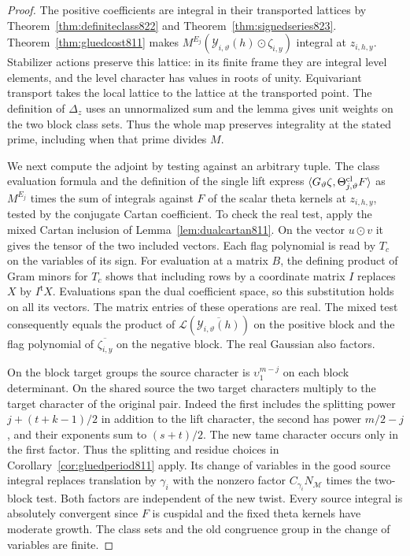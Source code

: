\documentclass[a4paper,11pt]{article}
\theoremstyle{definition}
\theoremstyle{remark}
\numberwithin{equation}{section}
\begin{document}
\begin{proof}
The positive coefficients are integral in their transported lattices
by Theorem~\ref{thm:definiteclass822} and
Theorem~\ref{thm:signedseries823}. Theorem~\ref{thm:gluedcost811}
makes \(M^{E_j}(\mathcal Y_{i,\vartheta}(h)\odot\zeta_{i,y})\)
integral at \(z_{i,h,y}\). Stabilizer actions preserve this lattice:
in its finite frame they are integral level elements, and the
level character has values in roots of unity. Equivariant transport
takes the local lattice to the lattice at the transported point.
The definition of \(\Delta_z\) uses an unnormalized sum and the
lemma gives unit weights on the two block class sets. Thus the
whole map preserves integrality at the stated prime, including
when that prime divides \(M\).

We next compute the adjoint by testing against an arbitrary tuple.
The class evaluation formula and the definition of the single lift
express \(\langle G_\vartheta\zeta,\Theta_{j,\vartheta}^{\rm cl}F\rangle\)
as \(M^{E_j}\) times the sum of integrals against \(F\) of the scalar
theta kernels at \(z_{i,h,y}\), tested by the conjugate Cartan
coefficient. To check the real test, apply the mixed Cartan
inclusion of Lemma~\ref{lem:dualcartan811}. On the vector \(u\odot v\)
it gives the tensor of the two included vectors. Each flag
polynomial is read by \(T_c\) on the variables of its sign.
For evaluation at a matrix \(B\), the defining product of Gram
minors for \(T_c\) shows that including rows by a coordinate
matrix \(I\) replaces \(X\) by \(I^{\mathsf t}X\).
Evaluations span the dual coefficient space, so this substitution
holds on all its vectors. The matrix entries of these operations
are real. The mixed test consequently equals the product of
\(\mathcal L(\overline{\mathcal Y_{i,\vartheta}(h)})\) on the
positive block and the flag polynomial of
\(\overline{\zeta_{i,y}}\) on the negative block. The real Gaussian
also factors.

On the block target groups the source character is
\(\upsilon_1^{m-j}\) on each block determinant. On the shared
source the two target characters multiply to the target character
of the original pair. Indeed the first includes the splitting
power \(j+(t+k-1)/2\) in addition to the lift character, the
second has power \(m/2-j\), and their exponents sum to
\((s+t)/2\). The new tame character occurs only in the first
factor. Thus the splitting and residue choices in
Corollary~\ref{cor:gluedperiod811} apply. Its change of variables
in the good source integral replaces translation by \(\gamma_i\)
with the nonzero factor \(C_{\gamma_i}N_{\mathcal M}\) times the
two-block test. Both factors are independent of the new twist.
Every source integral is absolutely convergent since \(F\) is
cuspidal and the fixed theta kernels have moderate growth.
The class sets and the old congruence group in the change of
variables are finite.


\end{proof}
\end{document}
